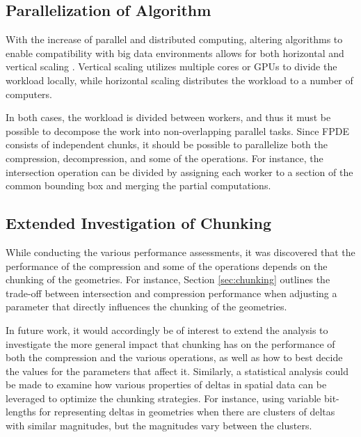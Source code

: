 \subsection{Parallelization of Algorithm}
With the increase of parallel and distributed computing, altering algorithms to enable compatibility with big data environments allows for both horizontal and vertical scaling \cite{parallell}. Vertical scaling utilizes multiple cores or GPUs to divide the workload locally, while horizontal scaling distributes the workload to a number of computers.

In both cases, the workload is divided between workers, and thus it must be possible to decompose the work into non-overlapping parallel tasks. Since FPDE consists of independent chunks, it should be possible to parallelize both the compression, decompression, and some of the operations. For instance, the intersection operation can be divided by assigning each worker to a section of the common bounding box and merging the partial computations.


\subsection{Extended Investigation of Chunking}
While conducting the various performance assessments, it was discovered that the performance of the compression and some of the operations depends on the chunking of the geometries. For instance, Section \ref{sec:chunking} outlines the trade-off between intersection and compression performance when adjusting a parameter that directly influences the chunking of the geometries.

In future work, it would accordingly be of interest to extend the analysis to investigate the more general impact that chunking has on the performance of both the compression and the various operations, as well as how to best decide the values for the parameters that affect it. Similarly, a statistical analysis could be made to examine how various properties of deltas in spatial data can be leveraged to optimize the chunking strategies. For instance, using variable bit-lengths for representing deltas in geometries when there are clusters of deltas with similar magnitudes, but the magnitudes vary between the clusters.




